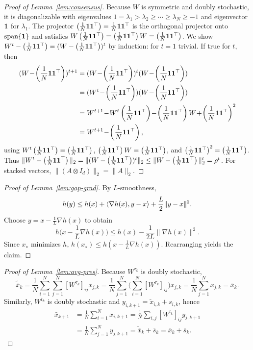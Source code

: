 \documentclass[review,onefignum,onetabnum]{siamart171218}
\begin{document}
\begin{proof}[Proof of Lemma~\ref{lem:consensus}]
Because $W$ is symmetric and doubly stochastic, it is diagonalizable with eigenvalues
$1=\lambda_1>\lambda_2\ge\cdots\ge\lambda_N\ge -1$ and eigenvector $\mathbf{1}$ for $\lambda_1$.
The projector $\left(\frac{1}{N}\mathbf{1}\mathbf{1}^\top\right)=\frac1N\mathbf{1}\mathbf{1}^\top$ is the orthogonal projector onto $\mathrm{span}\{\mathbf{1}\}$ and satisfies $W\left(\frac{1}{N}\mathbf{1}\mathbf{1}^\top\right)=\left(\frac{1}{N}\mathbf{1}\mathbf{1}^\top\right) W=\left(\frac{1}{N}\mathbf{1}\mathbf{1}^\top\right)$.
We show $W^t-\left(\frac{1}{N}\mathbf{1}\mathbf{1}^\top\right)=(W-\left(\frac{1}{N}\mathbf{1}\mathbf{1}^\top\right))^t$ by induction: for $t=1$ trivial. If true for $t$, then
\begin{align*}
(W\!-\!\J)^{t+1}&=(W\!-\!\J)^t(W\!-\!\J)\\
&=(W^t\!-\!\J)(W\!-\!\J)\\
&=W^{t+1}\!-\!W^t\J\!-\!\J W\!+\!\J^2\\
&=W^{t+1}\!-\!\J,
\end{align*}
using $W^t\left(\frac{1}{N}\mathbf{1}\mathbf{1}^\top\right)=\left(\frac{1}{N}\mathbf{1}\mathbf{1}^\top\right)$, $\left(\frac{1}{N}\mathbf{1}\mathbf{1}^\top\right) W=\left(\frac{1}{N}\mathbf{1}\mathbf{1}^\top\right)$, and $\left(\frac{1}{N}\mathbf{1}\mathbf{1}^\top\right)^2=\left(\frac{1}{N}\mathbf{1}\mathbf{1}^\top\right)$.
Thus $\|W^t-\left(\frac{1}{N}\mathbf{1}\mathbf{1}^\top\right)\|_2=\|(W-\left(\frac{1}{N}\mathbf{1}\mathbf{1}^\top\right))^t\|_2\le \|W-\left(\frac{1}{N}\mathbf{1}\mathbf{1}^\top\right)\|_2^t=\rho^t$.
For stacked vectors, $\|(A\otimes I_d)\|_2=\|A\|_2$.
\end{proof}

\begin{proof}[Proof of Lemma~\ref{lem:gap-grad}]
By $L$-smoothness,
\[
h(y)\le h(x)+\left\langle \nabla h(x),y-x\right\rangle+\frac{L}{2}\|y-x\|^2.
\]
Choose $y=x-\frac1L\nabla h(x)$ to obtain
\[
h\Big(x-\frac1L\nabla h(x)\Big)\le h(x)-\frac{1}{2L}\|\nabla h(x)\|^2.
\]
Since $x_\star$ minimizes $h$, $h(x_\star)\le h(x-\frac1L\nabla h(x))$. Rearranging yields the claim.
\end{proof}

\begin{proof}[Proof of Lemma~\ref{lem:avg-pres}]
Because $W^{\tau_k}$ is doubly stochastic,
\[
\tilde{\bar x}_k=\frac1N\sum_{i=1}^N\sum_{j=1}^N [W^{\tau_k}]_{ij}x_{j,k}
=\frac1N\sum_{j=1}^N\Big(\sum_{i=1}^N [W^{\tau_k}]_{ij}\Big)x_{j,k}
=\frac1N\sum_{j=1}^N x_{j,k}=\bar x_k.
\]
Similarly, $W^{t_k}$ is doubly stochastic and $y_{i,k+1}=\tilde x_{i,k}+s_{i,k}$, hence
\begin{align*}
\bar x_{k+1}
&=\tfrac1N\textstyle\sum_{i=1}^N x_{i,k+1}
=\tfrac1N\textstyle\sum_{i,j} [W^{t_k}]_{ij}y_{j,k+1}\\
&=\tfrac1N\textstyle\sum_{j=1}^N y_{j,k+1}
=\tilde{\bar x}_k+\bar s_k=\bar x_k+\bar s_k.
\end{align*}
\end{proof}
\end{document}
